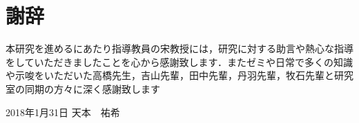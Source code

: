 \documentclass[12pt]{optlab-bachelor}
\def\氏名{天本　祐希}
\begin{document}
\chapter*{謝辞}
本研究を進めるにあたり指導教員の宋教授には，研究に対する助言や熱心な指導をしていただきましたことを心から感謝致します．またゼミや日常で多くの知識や示唆をいただいた高橋先生，吉山先輩，田中先輩，丹羽先輩，牧石先輩と研究室の同期の方々に深く感謝致します

\begin{flushright}
  2018年1月31日 \氏名
\end{flushright}
\endmatter
\end{document}
